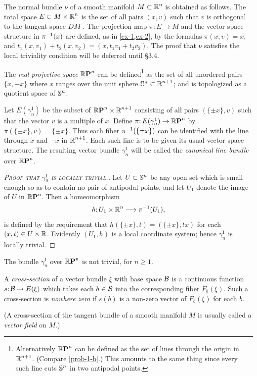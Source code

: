 \begin{example}\label{ex-2-3}
	The normal bundle $\nu$ of a smooth manifold $M \subset \boldsymbol{\mathbb{R}}^n$ is
	obtained as follows. The total space
	$E \subset M \times \boldsymbol{\mathbb{R}}^n$
	is the set of all pairs $(x, v)$ such that $v$ is orthogonal to the tangent
	space $DM$ . The projection map $\pi\mathpunct{:} E \to M$ and the vector space 
	structure in $\pi^{-1}(x)$ are defined, as in \cref{ex-1,ex-2}, by the formulas $\pi(x, v) =
	x$, and $t_1(x, v_1) +
	t_2(x, v_2) =
	(x, t_1v_1 +
	t_2v_2)$. The proof that $\nu$ satisfies
	the local triviality condition will be deferred until \S 3.4.
\end{example}
\begin{example}\label{ex-2-4}
	 The \textit{real projective space} $\boldsymbol{\mathbb{R}}\boldsymbol{\mathrm{P}}^{n}$ can be defined\footnote{Alternatively $\boldsymbol{\mathbb{R}}\boldsymbol{\mathrm{P}}^{n}$ can be defined as the set of lines through the origin in
	$\boldsymbol{\mathbb{R}}^{n+1}$.
	(Compare \cref{prob-1-b}.) This amounts to the same thing since every
	such line cuts $\mathbb{S}^{n}$ in two antipodal points.} as the
set of all unordered pairs $\{x, -x\}$ where $x$ ranges over the unit sphere
$\mathbb{S}^{n} \subset\boldsymbol{\mathbb{R}}^{n+1}$; and is topologized as a quotient space of $\mathbb{S}^{n}$.

Let $E(\gamma^1_n)$ be the subset of $\boldsymbol{\mathbb{R}}\boldsymbol{\mathrm{P}}^{n}\times \boldsymbol{\mathbb{R}}^{n+1}$ consisting of all pairs
$(\{\pm x\}, v)$ such that the vector $v$ is a multiple of $x$. Define $\pi\mathpunct{:} E(\gamma^1_n)\to \boldsymbol{\mathbb{R}}\boldsymbol{\mathrm{P}}^{n}$
	by $\pi(\{\pm x\} , v) =
		\{\pm x\}$. Thus each fiber $\pi^{-1}(\{\pm x\})$ can be identified with
		the line through $x$ and $-x$ in $\boldsymbol{\mathbb{R}}^{n+1}$. Each such line is to be given its
		usual vector space structure. The resulting vector bundle $\gamma^1_n$ will be
		called the \textit{canonical line bundle} over $\boldsymbol{\mathbb{R}}\boldsymbol{\mathrm{P}}^{n}$.
		
		\begin{proof}
			[\textsc{Proof that $\gamma^1_n$ is locally trivial.}] Let $U \subset \mathbb{S}^{n}$ be any open set which
			is small enough so as to contain no pair of antipodal points, and let $U_1$
			denote the image of $U$ in $\boldsymbol{\mathbb{R}}\boldsymbol{\mathrm{P}}^{n}$. Then a homeomorphism
			\[h\mathpunct{:}U_1\times \boldsymbol{\mathbb{R}}^n\longrightarrow\pi^{-1}(U_1),\]
			is defined by the requirement that $h(\{\pm x\},t)=(\{\pm x\},tx)$ for each $(x, t)\in U \times \boldsymbol{\mathbb{R}}$. Evidently $(U_1,h)$ is a local coordinate system;
			hence $\gamma^1_n$ is locally trivial.
		\end{proof}
\end{example}

\begin{theorem}\label{thm-2-1}
	The bundle $\gamma^1_n$ over $\boldsymbol{\mathbb{R}}\boldsymbol{\mathrm{P}}^{n}$ is not trivial, for
	$n \geq 1$.
\end{theorem}
\begin{definition}\label{def:2-3}
	A \textit{cross-section} of a vector bundle $\xi$ with base space
	$\mathcal{B}$ is a continuous function $s\mathpunct{:}\mathcal{B}\to E(\xi)$ which takes each $b \in \mathcal{B}$ into the corresponding fiber $F_b (\xi)$. Such a
	cross-section is \textit{nowhere zero} if $s(b)$ is a non-zero vector of $F_b (\xi)$ for
	each $b$. 
	
	(A cross-section of the tangent bundle of a smooth manifold $M$ is
	usually called a \textit{vector field} on $M$.)
	
\end{definition}


